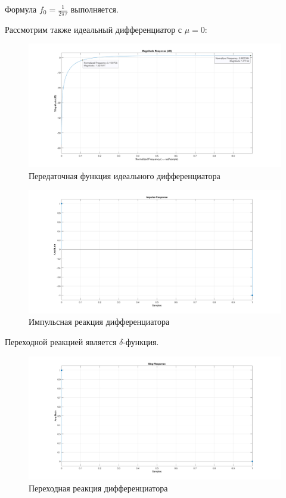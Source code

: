 \documentclass[12pt,a4paper]{article}
\begin{document}
	Формула $f_0 = \frac{1}{2 \pi \tau}$ выполняется.
	
	Рассмотрим также идеальный дифференциатор с $\mu = 0$:
	
	\begin{figure}[H]
		\centering
		\includegraphics[width=1.0\linewidth]{res/2_8_ach.png}
		\caption{Передаточная функция идеального дифференциатора}
	\end{figure}
	
	\begin{figure}[H]
		\centering
		\includegraphics[width=1.0\linewidth]{res/2_8_idealimpulse.png}
		\caption{Импульсная реакция дифференциатора}
	\end{figure}	
	
	Переходной реакцией является $\delta$-функция.
	\begin{figure}[H]
		\centering
		\includegraphics[width=1.0\linewidth]{res/2_8_idealstep.png}
		\caption{Переходная реакция дифференциатора}
	\end{figure}	
	
\end{document}
